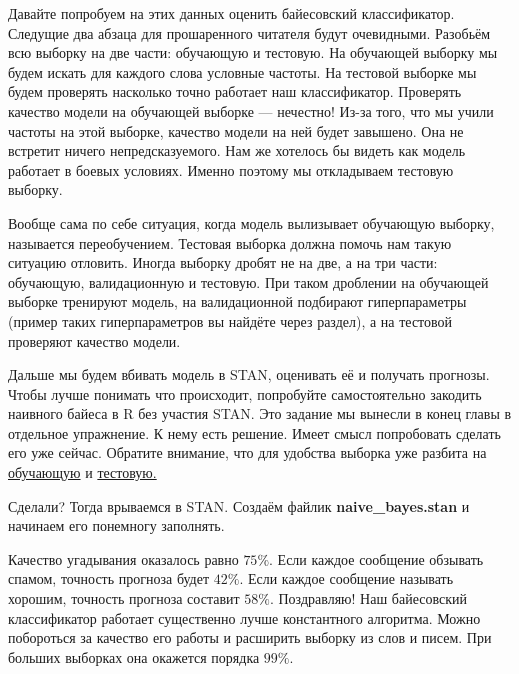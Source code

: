 \documentclass[12pt, a4paper, oneside]{extreport}
\theoremstyle{plain}              %
\theoremstyle{definition}         %
\begin{document}
Давайте попробуем на этих данных оценить байесовский классификатор. Следущие два абзаца для прошаренного читателя будут очевидными. Разобьём всю выборку на две части: обучающую и тестовую. На обучающей выборку мы будем искать для каждого слова условные частоты. На тестовой выборке мы будем проверять насколько точно работает наш классификатор.  Проверять качество модели на обучающей выборке --- нечестно!  Из-за того, что мы учили частоты на этой выборке, качество модели на ней будет завышено. Она не встретит ничего непредсказуемого. Нам же хотелось бы видеть как модель работает в боевых условиях.  Именно поэтому мы откладываем тестовую выборку. 

Вообще сама по себе ситуация, когда модель вылизывает обучающую выборку, называется переобучением. Тестовая выборка должна помочь нам такую ситуацию отловить. Иногда выборку дробят не на две, а на три части: обучающую, валидационную и тестовую. При таком дроблении на обучающей выборке тренируют модель, на валидационной подбирают гиперпараметры (пример таких гиперпараметров вы найдёте через раздел), а на тестовой проверяют качество модели. 

Дальше мы будем вбивать модель в STAN, оценивать её и получать прогнозы. Чтобы лучше понимать что происходит, попробуйте самостоятельно закодить наивного байеса в R без участия STAN. Это задание мы вынесли в конец главы в отдельное упражнение. К нему есть решение. Имеет смысл попробовать сделать его уже сейчас. Обратите внимание, что для удобства выборка уже разбита на \href{https://raw.githubusercontent.com/FUlyankin/bayes_book/master/itog_scripts/naive_bayes/spam_train.csv}{обучающую} и \href{https://raw.githubusercontent.com/FUlyankin/bayes_book/master/itog_scripts/naive_bayes/spam_test.csv}{тестовую.} 

Сделали? Тогда врываемся в STAN. Создаём файлик \textbf{naive\_bayes.stan} и начинаем его понемногу заполнять. 





Качество угадывания оказалось равно $75\%$. Если каждое сообщение обзывать спамом, точность прогноза будет $42\%$. Если каждое сообщение называть хорошим, точность прогноза составит $58\%$. Поздравляю! Наш байесовский классификатор работает существенно лучше константного алгоритма. Можно побороться за качество его работы и расширить выборку из слов и писем. При больших выборках она окажется порядка $99\%$. 
\end{document}
